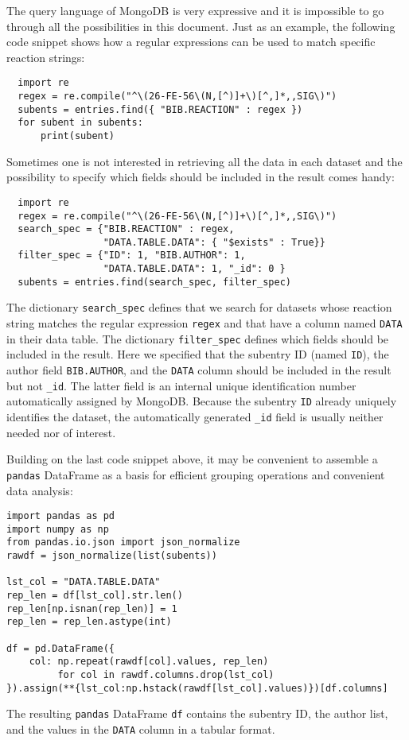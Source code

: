 \documentclass[12pt,a4paper]{scrartcl}
\begin{document}
The query language of MongoDB is very expressive and it is impossible to go through all the possibilities in this document.
Just as an example, the following code snippet shows how a regular expressions can be used to match specific reaction strings:
\begin{verbatim}
  import re
  regex = re.compile("^\(26-FE-56\(N,[^)]+\)[^,]*,,SIG\)")
  subents = entries.find({ "BIB.REACTION" : regex })
  for subent in subents:
      print(subent)

\end{verbatim}
Sometimes one is not interested in retrieving all the data in each dataset and the possibility to specify which fields should be included in the result comes handy:
\begin{verbatim}
  import re
  regex = re.compile("^\(26-FE-56\(N,[^)]+\)[^,]*,,SIG\)")
  search_spec = {"BIB.REACTION" : regex, 
                 "DATA.TABLE.DATA": { "$exists" : True}}
  filter_spec = {"ID": 1, "BIB.AUTHOR": 1, 
                 "DATA.TABLE.DATA": 1, "_id": 0 }
  subents = entries.find(search_spec, filter_spec)
\end{verbatim}
The dictionary \verb|search_spec| defines that we search for datasets whose reaction string matches the regular expression \verb|regex| and that have a column named \verb|DATA| in their data table.
The dictionary \verb|filter_spec| defines which fields should be included in the result.
Here we specified that the subentry ID (named \verb|ID|), the author field \verb|BIB.AUTHOR|, and the \verb|DATA| column should be included in the result but not \verb|_id|.
The latter field is an internal unique identification number automatically assigned by MongoDB.
Because the subentry \verb|ID| already uniquely identifies the dataset, the automatically generated \verb|_id| field is usually neither needed nor of interest.

Building on the last code snippet above, it may be convenient to assemble a \verb|pandas| DataFrame as a basis for efficient grouping operations and convenient data analysis:
\begin{verbatim}
import pandas as pd
import numpy as np
from pandas.io.json import json_normalize
rawdf = json_normalize(list(subents))

lst_col = "DATA.TABLE.DATA"
rep_len = df[lst_col].str.len()
rep_len[np.isnan(rep_len)] = 1
rep_len = rep_len.astype(int)

df = pd.DataFrame({
    col: np.repeat(rawdf[col].values, rep_len)
         for col in rawdf.columns.drop(lst_col)
}).assign(**{lst_col:np.hstack(rawdf[lst_col].values)})[df.columns]
\end{verbatim}
The resulting \verb|pandas| DataFrame \verb|df| contains the subentry ID, the author list, and the values in the \verb|DATA| column in a tabular format.
\end{document}

